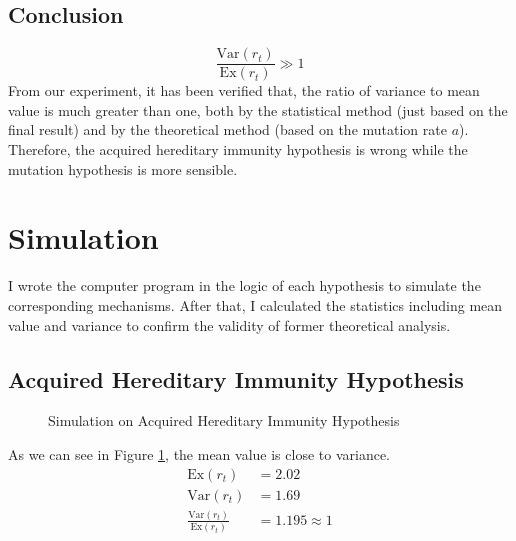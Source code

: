 \documentclass[UTF-8]{article}
\begin{document}
\subsection{Conclusion}
$$
        \frac{\text{Var}(r_t)}{\text{Ex}(r_t)}\gg1
$$
From our experiment, it has been verified that, the ratio of variance to mean value is much greater than one, both by the statistical method (just based on the final result) and by the theoretical method (based on the mutation rate $a$).
Therefore, the acquired hereditary immunity hypothesis is wrong while the mutation hypothesis is more sensible.
\section{Simulation}
I wrote the computer program in the logic of each hypothesis to simulate the corresponding mechanisms.
After that, I calculated the statistics including mean value and variance to confirm the validity of former theoretical analysis.
\subsection{Acquired Hereditary Immunity Hypothesis}
\begin{figure}[h]
    \centering
    \caption{Simulation on Acquired Hereditary Immunity Hypothesis}  
    \label{Simulation on Acquired Hereditary Immunity Hypothesis}
 \end{figure}
As we can see in Figure \ref{Simulation on Acquired Hereditary Immunity Hypothesis}, the mean value is close to variance.
\begin{align}
    \text{Ex}(r_t)&=2.02\\
    \text{Var}(r_t)&=1.69\\
    \frac{\text{Var}(r_t)}{\text{Ex}(r_t)}&=1.195\approx1
\end{align}
\end{document}
